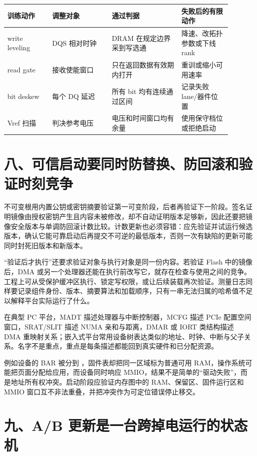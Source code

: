 \begin{longtable}{L{0.18\linewidth}L{0.24\linewidth}L{0.28\linewidth}L{0.20\linewidth}}
\toprule
训练动作 & 调整对象 & 通过判据 & 失败后的有限动作 \\
\midrule
write leveling & DQS 相对时钟 & DRAM 在规定边界采到写选通 & 降速、改拓扑参数或下线 rank \\\tablerowrule
read gate & 接收使能窗口 & 只在返回数据有效期内打开 & 重训或缩小可用速率 \\\tablerowrule
bit deskew & 每个 DQ 延迟 & 所有 bit 均有连续通过区间 & 记录失败 lane/器件位置 \\\tablerowrule
Vref 扫描 & 判决参考电压 & 电压和时间窗口均有余量 & 使用保守档位或拒绝启动 \\
\bottomrule
\end{longtable}

\section{八、可信启动要同时防替换、防回滚和验证时刻竞争}

不可变根用内置公钥或密钥摘要验证第一可变阶段，后者再验证下一阶段。签名证明镜像由授权密钥产生且内容未被修改，却不自动证明版本足够新，因此还要把镜像安全版本与单调防回滚计数比较。计数更新也必须容错：应先验证并试运行候选版本，确认它能可靠启动后再提交不可逆的最低版本，否则一次有缺陷的更新可能同时封死旧版本和新版本。

“验证后才执行”还要求验证对象与执行对象是同一份内容。若验证 Flash 中的镜像后，DMA 或另一个处理器还能在执行前改写它，就存在检查与使用之间的竞争。工程上可从受保护缓冲区执行、锁定写权限，或让后续装载再次验证。测量日志同样要记录组件身份、版本、摘要算法和加载顺序，只有一串无法归属的哈希值不足以解释平台实际运行了什么。


在典型 PC 平台，MADT 描述处理器与中断控制器，MCFG 描述 PCIe 配置空间窗口，SRAT/SLIT 描述 NUMA 亲和与距离，DMAR 或 IORT 类结构描述 DMA 重映射关系；嵌入式平台常用设备树表达类似的地址、时钟、中断与父子关系。名字不是重点，重点是每条描述都能回到真实硬件和已分配资源。

例如设备的 BAR 被分到 ，固件表却把同一区域标为普通可用 RAM，操作系统可能把页面分配给应用，而设备同时响应 MMIO，结果不是简单的“驱动失败”，而是地址所有权冲突。启动阶段应验证内存图中的 RAM、保留区、固件运行区和 MMIO 窗口互不非法重叠，并把冲突作为可定位错误停止移交。

\section{九、A/B 更新是一台跨掉电运行的状态机}

